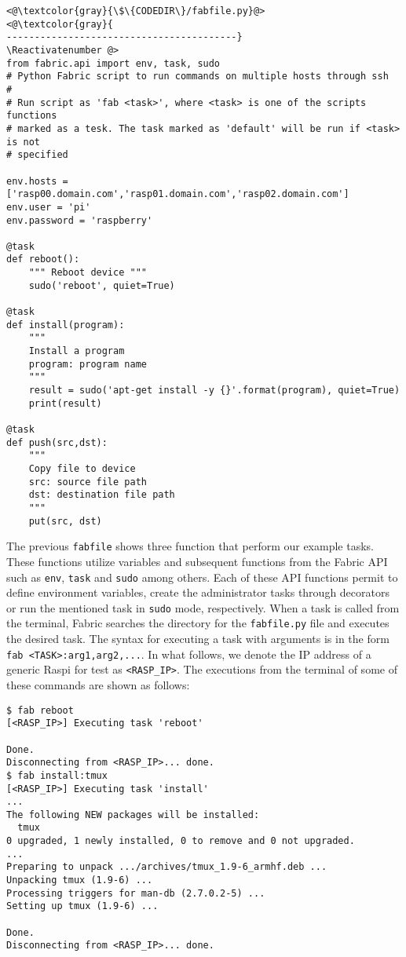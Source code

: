 \Suppressnumber\begin{lstlisting}[]
<@\textcolor{gray}{\$\{CODEDIR\}/fabfile.py}@>
<@\textcolor{gray}{
-----------------------------------------}
\Reactivatenumber @>
from fabric.api import env, task, sudo
# Python Fabric script to run commands on multiple hosts through ssh
#
# Run script as 'fab <task>', where <task> is one of the scripts functions
# marked as a tesk. The task marked as 'default' will be run if <task> is not
# specified

env.hosts = ['rasp00.domain.com','rasp01.domain.com','rasp02.domain.com']
env.user = 'pi'
env.password = 'raspberry'

@task
def reboot():
    """ Reboot device """
    sudo('reboot', quiet=True)

@task
def install(program):
    """
    Install a program
    program: program name
    """
    result = sudo('apt-get install -y {}'.format(program), quiet=True)
    print(result)

@task
def push(src,dst):
    """
    Copy file to device
    src: source file path
    dst: destination file path
    """
    put(src, dst)

\end{lstlisting}
\FloatBarrier

The previous \texttt{fabfile} shows three function that perform our
example tasks. These functions utilize variables and subsequent functions
from the Fabric \ac{API} such as \texttt{env}, \texttt{task} and \texttt{sudo}
among others. Each of these \ac{API} functions permit to define environment
variables, create the administrator tasks through decorators or run the
mentioned task in \texttt{sudo} mode, respectively.
When a task is called from the terminal, Fabric searches the directory for
the \texttt{fabfile.py} file and executes the desired task. The syntax for
executing a task with arguments is in the form
\texttt{fab <TASK>:arg1,arg2,...}. In what follows, we denote the
\ac{IP} address of a generic \ac{Raspi} for test as \texttt{<RASP\_IP>}.
The executions from the terminal of some of these commands are shown as
follows:

\begin{lstlisting}[]
$ fab reboot
[<RASP_IP>] Executing task 'reboot'

Done.
Disconnecting from <RASP_IP>... done.
$ fab install:tmux
[<RASP_IP>] Executing task 'install'
...
The following NEW packages will be installed:
  tmux
0 upgraded, 1 newly installed, 0 to remove and 0 not upgraded.
...
Preparing to unpack .../archives/tmux_1.9-6_armhf.deb ...
Unpacking tmux (1.9-6) ...
Processing triggers for man-db (2.7.0.2-5) ...
Setting up tmux (1.9-6) ...

Done.
Disconnecting from <RASP_IP>... done.
\end{lstlisting}
\FloatBarrier
\vspace{-5mm}

